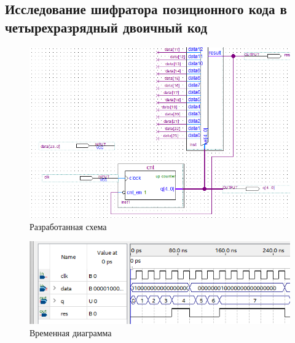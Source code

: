 \documentclass[a4paper,12pt]{article}
\begin{document}
    \subsection{Исследование шифратора позиционного кода в четырехразрядный двоичный код}
    \begin{figure}[H]
        \centering
        \includegraphics[width=\linewidth]{scheme_schiffer}
        \caption{Разработанная схема}
    \end{figure}
    \begin{figure}[H]
        \centering
        \includegraphics[width=\linewidth]{wave_schiffer}
        \caption{Временная диаграмма}
    \end{figure}
\end{document}
